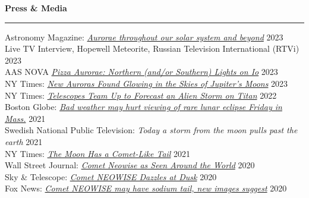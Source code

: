 \documentclass[12pt]{report}
\begin{document}
\noindent\bf{Press \& Media}\rm \hspace*{\fill} \\
\rule{\textwidth}{1pt}
\noindent Astronomy Magazine: \href{https://www.astronomy.com/science/aurorae-throughout-our-solar-system-and-beyond}{{\it Aurorae throughout our solar system and beyond}} \hfill 2023\\
\noindent Live TV Interview, Hopewell Meteorite, Russian Television International (RTVi) \hfill 2023\\
\noindent AAS NOVA \href{https://aasnova.org/2023/07/25/pizza-aurorae-northern-and-or-southern-lights-on-io/}{{\it Pizza Aurorae: Northern (and/or Southern) Lights on Io}} \hfill 2023\\
\noindent NY Times: \href{https://www.nytimes.com/2023/02/16/science/auroras-jupiter-moons.html}{{\it New Auroras Found Glowing in the Skies of Jupiter’s Moons}} \hfill 2023\\
\noindent NY Times: \href{https://www.nytimes.com/2022/12/05/science/titan-webb-telescope-pictures.html}{{\it Telescopes Team Up to Forecast an Alien Storm on Titan}} \hfill 2022\\
\noindent Boston Globe: \href{https://www.bostonglobe.com/2021/11/18/metro/bad-weather-may-hurt-viewing-rare-lunar-eclipse-early-friday-mass/}{{\it Bad weather may hurt viewing of rare lunar eclipse Friday in Mass.}} \hfill 2021\\
\noindent Swedish National Public Television: {\it Today a storm from the moon pulls past the earth} \hfill 2021\\
\noindent NY Times: \href{https://www.nytimes.com/2021/03/04/science/moon-tail-beam.html}{{\it The Moon Has a Comet-Like Tail}} \hfill 2021\\
\noindent Wall Street Journal: \href{https://www.wsj.com/articles/comet-neowise-as-seen-around-the-world-11595368898}{{\it Comet Neowise as Seen Around the World}} \hfill 2020\\
\noindent Sky \& Telescope: \href{https://skyandtelescope.org/astronomy-news/comet-neowise-dazzles-at-dusk/}{{\it Comet NEOWISE Dazzles at Dusk}} \hfill 2020\\
\noindent Fox News: \href{https://www.foxnews.com/science/comet-neowise-may-have-sodium-tail}{{\it Comet NEOWISE may have sodium tail, new images suggest}} \hfill 2020\\
\end{document}
